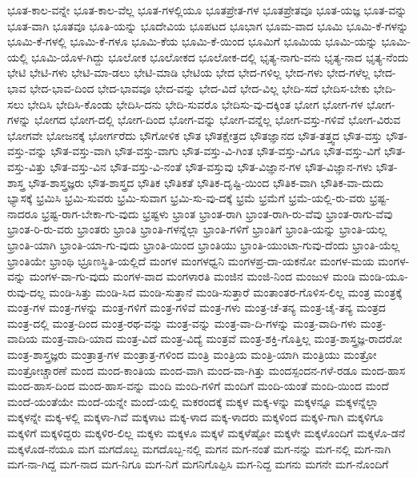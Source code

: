 {ಭೂತ-ಕಾಲ-ವನ್ನೇ
ಭೂತ-ಕಾಲ-ವೆಲ್ಲ
ಭೂತ-ಗಳಲ್ಲಿಯೂ
ಭೂತಪ್ರೇತ-ಗಳ
ಭೂತಪ್ರೇತವೂ
ಭೂತ-ಯಜ್ಞ
ಭೂತ-ವನ್ನು
ಭೂತ-ವಾಗಿ
ಭೂತವೂ
ಭೂತಿ-ಯನ್ನು
ಭೂದೇವಿಯ
ಭೂಪಟದ
ಭೂಭಾಗ
ಭೂಮ-ವಾದ
ಭೂಮಿ
ಭೂಮಿ-ಕೆ-ಗಳನ್ನು
ಭೂಮಿ-ಕೆ-ಗಳಲ್ಲಿ
ಭೂಮಿ-ಕೆ-ಗಳೂ
ಭೂಮಿ-ಕೆಯ
ಭೂಮಿ-ಕೆ-ಯಿಂದ
ಭೂಮಿಗೆ
ಭೂಮಿಯ
ಭೂಮಿ-ಯನ್ನು
ಭೂಮಿ-ಯಲ್ಲಿ
ಭೂಮಿ-ಯೊಳ-ಗಿದ್ದು
ಭೂಲೋಕ
ಭೂಲೋಕದ
ಭೂಲೋಕ-ದಲ್ಲಿ
ಭೃತ್ಯ-ನಾಗು-ವನು
ಭೃತ್ಯ-ನಾದ
ಭೃತ್ಯ-ನೆಂದು
ಭೇಟಿ
ಭೇಟಿ-ಗಳು
ಭೇಟಿ-ಮಾ-ಡಲು
ಭೇಟಿ-ಮಾಡಿ
ಭೇಟಿಯ
ಭೇದ
ಭೇದ-ಗಳಿಲ್ಲ
ಭೇದ-ಗಳು
ಭೇದ-ಗಳೆಲ್ಲ
ಭೇದ-ಭಾವ
ಭೇದ-ಭಾವ-ದಿಂದ
ಭೇದ-ಭಾವವೂ
ಭೇದ-ವನ್ನು
ಭೇದ-ವಿದೆ
ಭೇದ-ವಿಲ್ಲ
ಭೇದಿ-ಸದೆ
ಭೇದಿಸ-ಬೇಕು
ಭೇದಿ-ಸಲು
ಭೇದಿಸಿ
ಭೇದಿಸಿ-ಕೊಂಡು
ಭೇದಿಸಿ-ದನು
ಭೇದಿ-ಸುವರೊ
ಭೇದಿಸು-ವು-ದಕ್ಕಿಂತ
ಭೋಗ
ಭೋಗ-ಗಳ
ಭೋಗ-ಗಳನ್ನು
ಭೋಗದ
ಭೋಗ-ದಲ್ಲಿ
ಭೋಗ-ದಿಂದ
ಭೋಗ-ವನ್ನು
ಭೋಗ-ವನ್ನೆಲ್ಲ
ಭೋಗ-ವಸ್ತು-ಗಳಿವೆ
ಭೋಗ-ವಿರುವ
ಭೋಗವೇ
ಭೋಜನಕ್ಕೆ
ಭೋರ್ಗರೆದು
ಭೌಗೋಳಿಕ
ಭೌತ
ಭೌತಕ್ಷೇತ್ರದ
ಭೌತಜ್ಞಾನದ
ಭೌತ-ತತ್ತ್ವದ
ಭೌತ-ವಸ್ತು
ಭೌತ-ವಸ್ತು-ವನ್ನು
ಭೌತ-ವಸ್ತು-ವಾಗಿ
ಭೌತ-ವಸ್ತು-ವಾಗು
ಭೌತ-ವಸ್ತು-ವಿ-ಗಿಂತ
ಭೌತ-ವಸ್ತು-ವಿಗೂ
ಭೌತ-ವಸ್ತು-ವಿಗೆ
ಭೌತ-ವಸ್ತು-ವಿತ್ತು
ಭೌತ-ವಸ್ತು-ವಿನ
ಭೌತ-ವಸ್ತು-ವಿ-ನಂತೆ
ಭೌತ-ವಸ್ತುವು
ಭೌತ-ವಿಜ್ಞಾನ-ಗಳ
ಭೌತ-ವಿಜ್ಞಾನ-ಗಳು
ಭೌತ-ಶಾಸ್ತ್ರ
ಭೌತ-ಶಾಸ್ತ್ರಜ್ಞರು
ಭೌತ-ಶಾಸ್ತ್ರದ
ಭೌತಿಕ
ಭೌತಿಕತೆ
ಭೌತಿಕ-ದೃಷ್ಟಿ-ಯಿಂದ
ಭೌತಿಕ-ವಾಗಿ
ಭೌತಿಕ-ವಾ-ದುದು
ಭ್ಯಾಸಕ್ಕೆ
ಭ್ರಮಿಸಿ
ಭ್ರಮಿ-ಸುವರು
ಭ್ರಮಿ-ಸುವಾಗ
ಭ್ರಮಿ-ಸು-ವು-ದಕ್ಕೆ
ಭ್ರಮೆ
ಭ್ರಮೆಗೆ
ಭ್ರಮೆ-ಯಲ್ಲಿ-ರು-ವರು
ಭ್ರಷ್ಟ-ನಾದರೂ
ಭ್ರಷ್ಟ-ರಾಗ-ಬೇಕಾ-ಗು-ವುದು
ಭ್ರಷ್ಟಳು
ಭ್ರಾಂತ
ಭ್ರಾಂತ-ರಾಗಿ
ಭ್ರಾಂತ-ರಾಗಿ-ರು-ವೆವು
ಭ್ರಾಂತ-ರಾಗು-ವೆವು
ಭ್ರಾಂತ-ರಿ-ರು-ವರು
ಭ್ರಾಂತರು
ಭ್ರಾಂತಿ
ಭ್ರಾಂತಿ-ಗಳನ್ನೆಲ್ಲಾ
ಭ್ರಾಂತಿ-ಗಳಿಗೆ
ಭ್ರಾಂತಿಗೆ
ಭ್ರಾಂತಿ-ಯನ್ನು
ಭ್ರಾಂತಿ-ಯಲ್ಲ
ಭ್ರಾಂತಿ-ಯಾಗಿ
ಭ್ರಾಂತಿ-ಯಾ-ಗು-ವುದು
ಭ್ರಾಂತಿ-ಯಿಂದ
ಭ್ರಾಂತಿಯು
ಭ್ರಾಂತಿ-ಯುಂಟಾ-ಗುವು-ದೆಂದು
ಭ್ರಾಂತಿ-ಯೆಲ್ಲ
ಭ್ರಾಂತಿಯೇ
ಭ್ರಾಂಥಿ
ಭ್ರೂಣಸ್ಥಿತಿ-ಯಲ್ಲಿದೆ
ಮಂಗಳ
ಮಂಗಳಧ್ವನಿ
ಮಂಗಳಪ್ರ-ದಾ-ಯಕನೋ
ಮಂಗಳ-ಮಯ
ಮಂಗಳ-ವನ್ನು
ಮಂಗಳ-ವಾ-ಗು-ವುದು
ಮಂಗಳ-ವಾದ
ಮಂಗಳಾರತಿ
ಮಂಜಿನ
ಮಂಜಿ-ನಿಂದ
ಮಂಜುಳ
ಮಂಡಿ
ಮಂಡಿ-ಯೂ-ರುವು-ದಲ್ಲ
ಮಂಡಿ-ಸಿತ್ತು
ಮಂಡಿ-ಸಿದ
ಮಂಡಿ-ಸುತ್ತಾನೆ
ಮಂಡಿ-ಸುತ್ತಾರೆ
ಮಂತಾಂತರ-ಗೊಳಿಸ-ಲಿಲ್ಲ
ಮಂತ್ರ
ಮಂತ್ರಕ್ಕೆ
ಮಂತ್ರ-ಗಳ
ಮಂತ್ರ-ಗಳನ್ನು
ಮಂತ್ರ-ಗಳಿಗೆ
ಮಂತ್ರ-ಗಳಿವೆ
ಮಂತ್ರ-ಗಳು
ಮಂತ್ರ-ಚೆ-ತನ್ಯ
ಮಂತ್ರ-ಚೈ-ತನ್ಯ
ಮಂತ್ರದ
ಮಂತ್ರ-ದಲ್ಲಿ
ಮಂತ್ರ-ದಿಂದ
ಮಂತ್ರ-ರಥ-ವನ್ನು
ಮಂತ್ರ-ವನ್ನು
ಮಂತ್ರ-ವಾ-ದಿ-ಗಳನ್ನು
ಮಂತ್ರ-ವಾದಿ-ಗಳು
ಮಂತ್ರ-ವಾದಿಯ
ಮಂತ್ರ-ವಾದಿ-ಯಾದ
ಮಂತ್ರ-ವಿದೆ
ಮಂತ್ರ-ವಿದ್ಯೆ
ಮಂತ್ರವೆ
ಮಂತ್ರ-ಶಕ್ತಿ-ಗೊತ್ತಿಲ್ಲ
ಮಂತ್ರ-ಶಾಸ್ತ್ರಜ್ಞ-ರಾದರೋ
ಮಂತ್ರ-ಶಾಸ್ತ್ರಜ್ಞರು
ಮಂತ್ರಾತ್ರ-ಗಳ
ಮಂತ್ರಾತ್ರ-ಗಳಿಂದ
ಮಂತ್ರಿ
ಮಂತ್ರಿಯ
ಮಂತ್ರಿ-ಯಾಗಿ
ಮಂತ್ರಿಯು
ಮಂತ್ರೋ
ಮಂತ್ರೋಚ್ಚಾರಣೆ
ಮಂದ
ಮಂದ-ಕಾಂತಿಯ
ಮಂದ-ವಾಗಿ
ಮಂದ-ವಾ-ಗಿತ್ತು
ಮಂದಸ್ಪಂದನ-ಗಳೆ-ರಡೂ
ಮಂದ-ಹಾಸ
ಮಂದ-ಹಾಸ-ದಿಂದ
ಮಂದ-ಹಾಸ-ವನ್ನು
ಮಂದಿ
ಮಂದಿ-ಗಳಿಗೆ
ಮಂದಿಗೆ
ಮಂದಿ-ಯಂತೆ
ಮಂದಿ-ಯಿಂದ
ಮಂದೆ
ಮಂದೆ-ಯಂತೆಯೇ
ಮಂದೆ-ಯನ್ನೇ
ಮಂದೆ-ಯಲ್ಲಿ
ಮಕರಂದಕ್ಕೆ
ಮಕ್ಕಳ
ಮಕ್ಕ-ಳನ್ನು
ಮಕ್ಕಳನ್ನೂ
ಮಕ್ಕಳನ್ನೆಲ್ಲಾ
ಮಕ್ಕಳನ್ನೇ
ಮಕ್ಕ-ಳಲ್ಲಿ
ಮಕ್ಕಳಾ-ಗಿವೆ
ಮಕ್ಕಳಾಟ
ಮಕ್ಕ-ಳಾದ
ಮಕ್ಕ-ಳಾದರು
ಮಕ್ಕಳಿಂದ
ಮಕ್ಕಳಿ-ಗಾಗಿ
ಮಕ್ಕಳಿಗೂ
ಮಕ್ಕಳಿಗೆ
ಮಕ್ಕಳಿದ್ದರು
ಮಕ್ಕಳಿರ-ಲಿಲ್ಲ
ಮಕ್ಕಳು
ಮಕ್ಕಳೂ
ಮಕ್ಕಳೆ
ಮಕ್ಕಳೆಷ್ಟೋ
ಮಕ್ಕಳೇ
ಮಕ್ಕಳೊಂದಿಗೆ
ಮಕ್ಕಳೊ-ಡನೆ
ಮಕ್ಕಳೊಡ-ನೆಯೂ
ಮಗ
ಮಗದೊಬ್ಬ
ಮಗದೊಬ್ಬ-ನಲ್ಲಿ
ಮಗನ
ಮಗ-ನಂತೆ
ಮಗ-ನನ್ನು
ಮಗ-ನಲ್ಲಿ
ಮಗ-ನಾಗಿ
ಮಗ-ನಾ-ಗಿದ್ದ
ಮಗ-ನಾದ
ಮಗ-ನಿಗೂ
ಮಗ-ನಿಗೆ
ಮಗನಿಗೊಪ್ಪಿಸಿ
ಮಗ-ನಿದ್ದ
ಮಗನು
ಮಗನೇ
ಮಗ-ನೊಂದಿಗೆ
}
